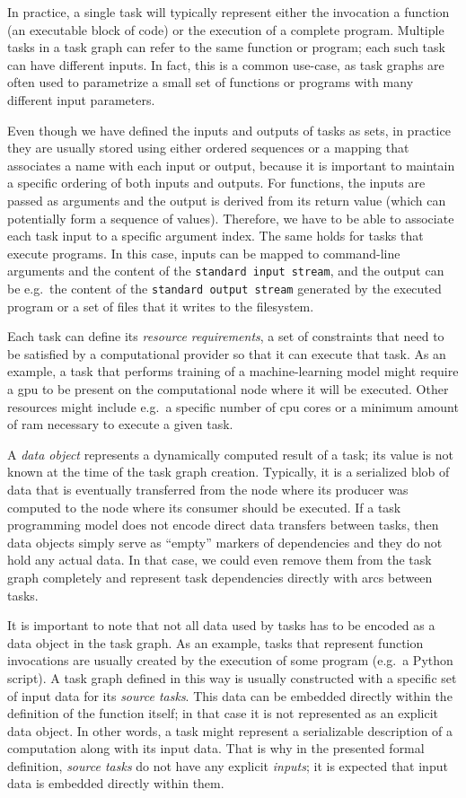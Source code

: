 In practice, a single task will typically represent either the invocation a function (an executable
block of code) or the execution of a complete program. Multiple tasks in a task graph can refer to
the same function or program; each such task can have different inputs. In fact, this is a common
use-case, as task graphs are often used to parametrize a small set of functions or programs with
many different input parameters.

Even though we have defined the inputs and outputs of tasks as sets, in practice they are usually
stored using either ordered sequences or a mapping that associates a name with each input or
output, because it is important to maintain a specific ordering of both inputs and outputs. For
functions, the inputs are passed as arguments and the output is derived from its return value
(which can potentially form a sequence of values). Therefore, we have to be able to associate each
task input to a specific argument index. The same holds for tasks that execute programs. In this
case, inputs can be mapped to command-line arguments and the content of the \texttt{standard input stream},
and the output can be e.g.\ the content of the \texttt{standard output stream} generated by the executed
program or a set of files that it writes to the filesystem.

Each task can define its \emph{resource requirements}, a set of constraints that need to be satisfied by
a computational provider so that it can execute that task. As an example, a task that performs
training of a machine-learning model might require a \gls{gpu} to be present on the
computational node where it will be executed. Other resources might include e.g.\ a specific number
of \gls{cpu} cores or a minimum amount of \gls{ram} necessary to execute
a given task.

A \emph{data object} represents a dynamically computed result of a task; its value is not known
at the time of the task graph creation. Typically, it is a serialized blob of data that is
eventually transferred from the node where its producer was computed to the node where its consumer
should be executed. If a task programming model does not encode direct data transfers between
tasks, then data objects simply serve as ``empty'' markers of dependencies and they do not hold any
actual data. In that case, we could even remove them from the task graph completely and represent
task dependencies directly with arcs between tasks.

It is important to note that not all data used by tasks has to be encoded as a data object in the
task graph. As an example, tasks that represent function invocations are usually created by the
execution of some program (e.g.\ a Python script). A task graph defined in this way is usually
constructed with a specific set of input data for its \emph{source tasks}. This data can be
embedded directly within the definition of the function itself; in that case it is not represented
as an explicit data object. In other words, a task might represent a serializable description of a
computation along with its input data. That is why in the presented formal definition,
\emph{source tasks} do not have any explicit \emph{inputs}; it is expected that input
data is embedded directly within them.


